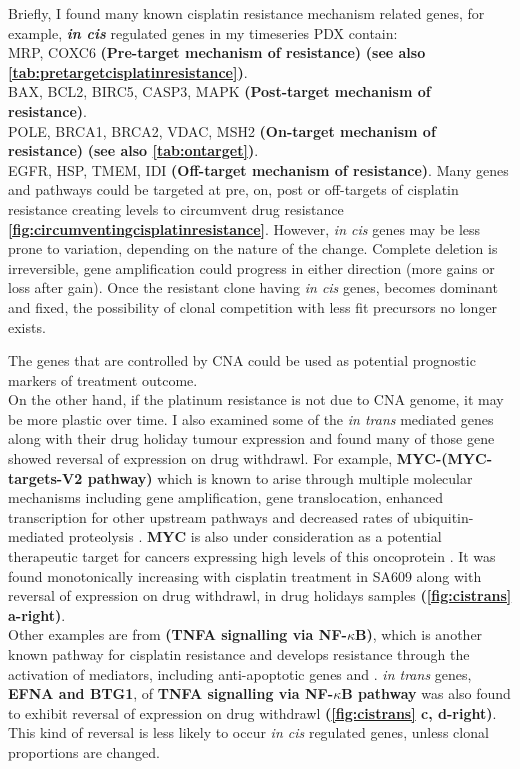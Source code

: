 Briefly, I found many known cisplatin resistance mechanism related genes, for example, \textbf{\textit{in cis}} regulated genes in my timeseries PDX  contain:
\\
MRP, COXC6  \textbf{(Pre-target mechanism of resistance)} \textbf{(see also \autoref{tab:pretargetcisplatinresistance})}.
\\
BAX, BCL2, BIRC5, CASP3, MAPK  \textbf{(Post-target mechanism of resistance)}.
\\
POLE, BRCA1, BRCA2, VDAC, MSH2 \textbf{(On-target mechanism of resistance)} \textbf{(see also \autoref{tab:ontarget})}.
\\
EGFR, HSP, TMEM, IDI \textbf{(Off-target mechanism of resistance)}.
 Many genes and pathways could be targeted at pre, on, post or off-targets of cisplatin resistance creating levels to circumvent drug resistance  \textbf{\autoref{fig:circumventingcisplatinresistance}}. However, \textit{in cis} genes may be less prone to variation, depending on the nature of the change. Complete deletion is irreversible, gene amplification could progress in either direction (more gains or loss after gain).
 Once the resistant clone having \textit{in cis} genes, becomes dominant and fixed, the possibility of clonal competition with less fit precursors no longer exists.

 The genes that are controlled by CNA could be used as potential prognostic markers of treatment outcome.
\\
On the other hand, if the platinum resistance is not due to CNA genome, it may be more plastic over time. I also examined some of the \textit{in trans} mediated genes along with their drug holiday tumour expression and found many of those gene showed reversal of expression on drug withdrawl. For example, \textbf{MYC-(MYC-targets-V2 pathway)}  which is known to arise through multiple molecular mechanisms including gene amplification, gene translocation, enhanced transcription for other upstream pathways and decreased rates of ubiquitin-mediated proteolysis \cite{dang2012myc}. \textbf{MYC} is also under consideration as a potential therapeutic target for cancers expressing high levels of this oncoprotein \cite{reyes2015targeting}. It was found monotonically increasing with cisplatin treatment in SA609 along with reversal of expression on drug withdrawl, in drug holidays samples \textbf{(\autoref{fig:cistrans} a-right)}. 
\\
Other examples are from \textbf{(TNFA signalling via NF-$\kappa$B)}, which is another known pathway for cisplatin resistance and develops resistance through the activation of mediators, including anti-apoptotic genes and  \cite{godwin2013targeting}. \textit{in trans} genes, \textbf{EFNA and BTG1},  of \textbf{TNFA signalling via NF-$\kappa$B pathway} was also found to exhibit reversal of expression on drug withdrawl
 \textbf{(\autoref{fig:cistrans} c, d-right)}. 
 This kind of reversal is less likely to occur \textit{in cis} regulated genes, unless clonal proportions are changed.  


